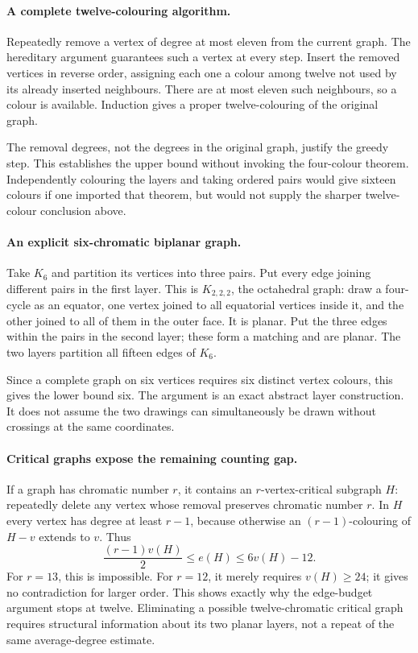 \documentclass[11pt,a4paper]{article}
\begin{document}
\paragraph{A complete twelve-colouring algorithm.}
Repeatedly remove a vertex of degree at most eleven from the current graph. The hereditary argument guarantees such a vertex at every step. Insert the removed vertices in reverse order, assigning each one a colour among twelve not used by its already inserted neighbours. There are at most eleven such neighbours, so a colour is available. Induction gives a proper twelve-colouring of the original graph.

The removal degrees, not the degrees in the original graph, justify the greedy step. This establishes the upper bound without invoking the four-colour theorem. Independently colouring the layers and taking ordered pairs would give sixteen colours if one imported that theorem, but would not supply the sharper twelve-colour conclusion above.

\paragraph{An explicit six-chromatic biplanar graph.}
Take $K_6$ and partition its vertices into three pairs. Put every edge joining different pairs in the first layer. This is $K_{2,2,2}$, the octahedral graph: draw a four-cycle as an equator, one vertex joined to all equatorial vertices inside it, and the other joined to all of them in the outer face. It is planar. Put the three edges within the pairs in the second layer; these form a matching and are planar. The two layers partition all fifteen edges of $K_6$.

Since a complete graph on six vertices requires six distinct vertex colours, this gives the lower bound six. The argument is an exact abstract layer construction. It does not assume the two drawings can simultaneously be drawn without crossings at the same coordinates.

\paragraph{Critical graphs expose the remaining counting gap.}
If a graph has chromatic number $r$, it contains an $r$-vertex-critical subgraph $H$: repeatedly delete any vertex whose removal preserves chromatic number $r$. In $H$ every vertex has degree at least $r-1$, because otherwise an $(r-1)$-colouring of $H-v$ extends to $v$. Thus
\[
\frac{(r-1)v(H)}2\le e(H)\le6v(H)-12.
\]
For $r=13$, this is impossible. For $r=12$, it merely requires $v(H)\ge24$; it gives no contradiction for larger order. This shows exactly why the edge-budget argument stops at twelve. Eliminating a possible twelve-chromatic critical graph requires structural information about its two planar layers, not a repeat of the same average-degree estimate.
\end{document}
